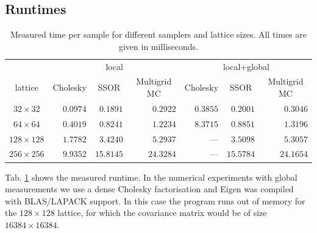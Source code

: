 \documentclass[11pt]{article}
\begin{document}
\subsection{Runtimes}
\begin{table}
    \begin{center}
        \begin{tabular}{crrrrrr}
            \hline
            & \multicolumn{3}{c}{local} & \multicolumn{3}{c}{local+global}\\
            lattice         & \multicolumn{1}{c}{Cholesky} & \multicolumn{1}{c}{SSOR} & \multicolumn{1}{c}{Multigrid MC} & \multicolumn{1}{c}{Cholesky} & \multicolumn{1}{c}{SSOR} & \multicolumn{1}{c}{Multigrid MC} \\
            \hline\hline
            $32\times 32$   & $0.0974$                     & $0.1891$                 & $0.2922$ & $0.3855$ & $0.2001$ & $0.3046$                        \\
            $64\times 64$   & $0.4019$                     & $0.8241$                 & $1.2234$ & $8.3715$ & $0.8851$ & $1.3196$                         \\
            $128\times 128$ & $1.7782$                    & $3.4240$                 & $5.2937$ & --- & $3.5098$ & $5.3057$                        \\
            $256\times 256$ & $9.9352$                   & $15.8145$                 & $24.3284$ & --- & $15.5784$ & $24.1654$                       \\
            \hline
        \end{tabular}
        \caption{Measured time per sample for different samplers and lattice sizes. All times are given in milliseconds.}
        \label{tab:runtimes}
    \end{center}
\end{table}
Tab. \ref{tab:runtimes} shows the measured runtime. In the numerical experiments with global measurements we use a dense Cholesky factorisation and Eigen was compiled with BLAS/LAPACK support. In this case the program runs out of memory for the $128\times 128$ lattice, for which the covariance matrix would be of size $16384\times 16384$.
\end{document}
